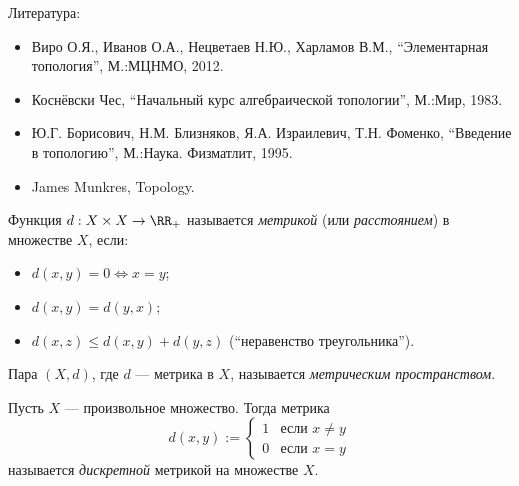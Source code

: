 \documentclass[12pt,a4paper]{article}
\date{}
\begin{document}
    \maketitle

    \listoftodos[TODOs]

    \tableofcontents

    \vspace{2em}

    Литература:
    \begin{itemize}
        \item Виро О.Я., Иванов О.А., Нецветаев Н.Ю., Харламов В.М., ``Элементарная топология'', М.:МЦНМО, 2012.
        \item Коснёвски Чес, ``Начальный курс алгебраической топологии'', М.:Мир, 1983.
        \item Ю.Г. Борисович, Н.М. Близняков, Я.А. Израилевич, Т.Н. Фоменко, ``Введение в топологию'', М.:Наука. Физматлит, 1995.
        \item James Munkres, Topology.
    \end{itemize}

    \begin{definition}
        Функция $d: X \times X \to \RR_+$ называется \emph{метрикой} (или \emph{расстоянием}) в множестве $X$, если:
        \begin{itemize}
            \item $d(x, y) = 0 \Leftrightarrow x = y$;
            \item $d(x, y) = d(y, x)$;
            \item $d(x, z) \leqslant d(x, y) + d(y, z)$ (``неравенство треугольника'').
        \end{itemize}
        Пара $(X, d)$, где $d$ --- метрика в $X$, называется \emph{метрическим пространством}.
    \end{definition}

    \begin{example}
        Пусть $X$ --- произвольное множество. Тогда метрика
        \[
            d(x, y) := 
                \begin{cases}
                    1& \text{если $x \neq y$}\\
                    0& \text{если $x = y$}
                \end{cases}
        \]
        называется \emph{дискретной} метрикой на множестве $X$.
    \end{example}
\end{document}
